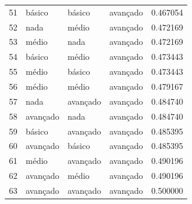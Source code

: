\documentclass[]{article}
\begin{document}
\begin{longtable}{|llll|r|}
		51 & básico   & básico   & avançado & 0.467054     \\
		52 & nada      & médio    & avançado & 0.472169     \\
		53 & médio    & nada      & avançado & 0.472169     \\
		54 & básico   & médio    & avançado & 0.473443     \\
		55 & médio    & básico   & avançado & 0.473443     \\
		56 & médio    & médio    & avançado & 0.479167     \\
		57 & nada      & avançado & avançado & 0.484740     \\
		58 & avançado & nada      & avançado & 0.484740     \\
		59 & básico   & avançado & avançado & 0.485395     \\
		60 & avançado & básico   & avançado & 0.485395     \\
		61 & médio    & avançado & avançado & 0.490196     \\
		62 & avançado & médio    & avançado & 0.490196     \\
		63 & avançado & avançado & avançado & 0.500000     \\
		\hline
	\end{longtable}
	
	
	
\end{document}
